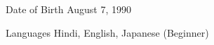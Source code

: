 

\begin{cvskills}

  \cvskill
    {Date of Birth} %
    {August 7, 1990} %

  \cvskill
    {Languages} %
    {Hindi, English, Japanese (Beginner)} %

\end{cvskills}
